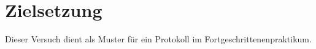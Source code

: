 \section{Zielsetzung}
\label{sec:zielsetzung}

Dieser Versuch dient als Muster für ein Protokoll im Fortgeschrittenenpraktikum.
